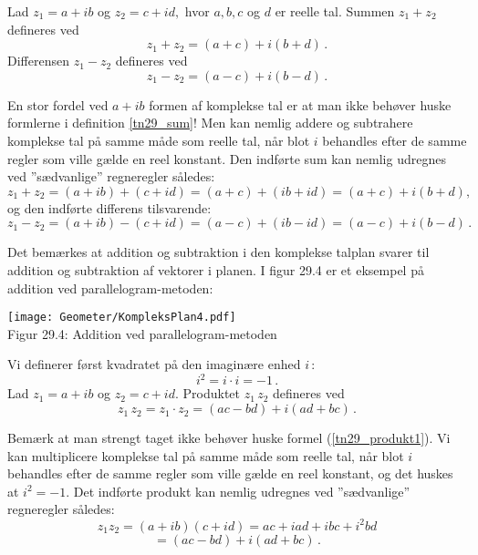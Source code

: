 \begin{definition}\label{tn29_sum}
Lad $z_1=a+ib$ og $z_2=c+id,$ hvor $a,b,c$ og $d$ er reelle tal.\bs
Summen $z_1+z_2$ defineres ved
\begin{equation}\label{tn29_sum1}
z_1+z_2=(a+c)+i(b+d)\,.
\end{equation}
Differensen $z_1-z_2$ defineres ved
\begin{equation}\label{tn29_sum2}
z_1-z_2=(a-c)+i(b-d)\,.
\end{equation}
\end{definition}
\begin{aha}
En stor fordel ved $a+ib$ formen af komplekse tal er at man ikke behøver huske formlerne i definition \ref{tn29_sum}! Men kan nemlig addere og subtrahere komplekse tal på samme måde som reelle tal, når blot $i$ behandles efter de samme regler som ville gælde en reel konstant. Den indførte sum kan nemlig udregnes ved ''sædvanlige'' regneregler således:
$$z_1+z_2=(a+ib)+(c+id)=(a+c)+(ib+id)=(a+c)+i(b+d),$$
og den indførte differens tilsvarende:
$$z_1-z_2=(a+ib)-(c+id)=(a-c)+(ib-id)=(a-c)+i(b-d)\,.$$
\end{aha}
\begin{example}
Det bemærkes at addition og subtraktion i den komplekse talplan svarer til addition og subtraktion af vektorer i planen. I figur 29.4 er et eksempel på addition ved parallelogram-metoden:
\begin{center}
	\texttt{[image: Geometer/KompleksPlan4.pdf]}\\
Figur 29.4: Addition ved parallelogram-metoden 
\end{center}
\end{example}


\begin{definition}\label{tn29_produkt}
Vi definerer først kvadratet på den imaginære enhed $i\,$:
$$i^2=i\cdot i =-1\,.$$
Lad $z_1=a+ib$ og $z_2=c+id$.\bs
Produktet $z_1\,z_2$ defineres ved
\begin{equation}\label{tn29_produkt1}
z_1\,z_2=z_1\cdot z_2= (ac-bd)+i(ad+bc)\,.
\end{equation}
\end{definition}
\begin{aha}
Bemærk at man strengt taget ikke behøver huske formel (\ref{tn29_produkt1}). Vi kan  multiplicere  komplekse tal på samme måde som reelle tal, når blot $i$ behandles efter de samme regler som ville gælde en reel konstant, og det huskes at $i^2=-1$. Det indførte produkt kan nemlig udregnes ved ''sædvanlige'' regneregler således:
$$z_1z_2=(a+ib)(c+id)=ac+iad+ibc+i^2bd$$
$$=(ac-bd)+i(ad+bc)\,.$$
\end{aha}

